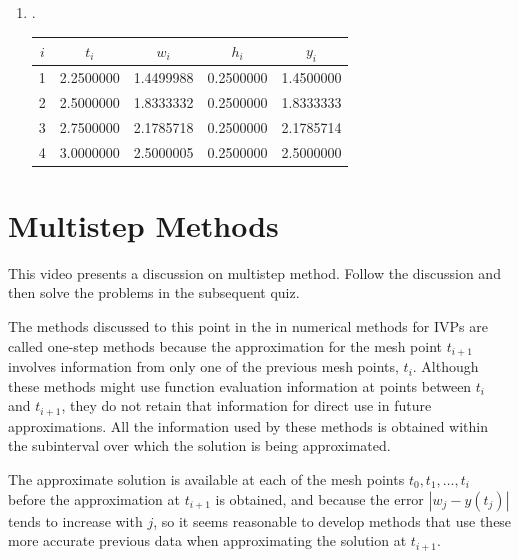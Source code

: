\begin{myexercise}
\begin{mysolution}
\begin{enumerate}[label=(\alph*)]
\item.

\begin{center}
\begin{tabular}{ccccc}
\hline
$i$ & $t_{i}$ & $w_{i}$ & $h_{i}$ & $y_{i}$ \\
\hline
1 & 2.2500000 & 1.4499988 & 0.2500000 & 1.4500000 \\
2 & 2.5000000 & 1.8333332 & 0.2500000 & 1.8333333 \\
3 & 2.7500000 & 2.1785718 & 0.2500000 & 2.1785714 \\
4 & 3.0000000 & 2.5000005 & 0.2500000 & 2.5000000 \\
\hline
\end{tabular}
\end{center}

\end{enumerate}
\end{mysolution}
\end{myexercise}


\section{Multistep Methods}
\videolesson
\begin{selfvideo}[2]
This video presents a discussion on multistep method. Follow the discussion and then solve the problems in the subsequent quiz.
\end{selfvideo}
The methods discussed to this point in the in numerical methods for IVPs are called one-step methods because the approximation for the mesh point $t_{i+1}$ involves information from only one of the previous mesh points, $t_{i}$. Although these methods might use function evaluation information at points between $t_{i}$ and $t_{i+1}$, they do not retain that information for direct use in future approximations. All the information used by these methods is obtained within the subinterval over which the solution is being approximated.

The approximate solution is available at each of the mesh points $t_{0}, t_{1}, \ldots, t_{i}$ before the approximation at $t_{i+1}$ is obtained, and because the error $\left|w_{j}-y\left(t_{j}\right)\right|$ tends to increase with $j$, so it seems reasonable to develop methods that use these more accurate previous data when approximating the solution at $t_{i+1}$.

